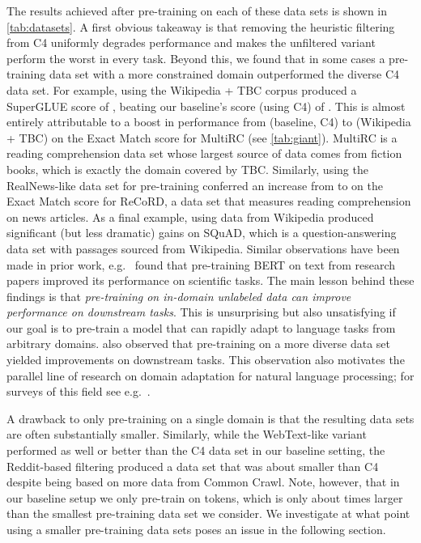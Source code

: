 \documentclass[twoside,11pt]{article}
\begin{document}
The results achieved after pre-training on each of these data sets is shown in \cref{tab:datasets}.
A first obvious takeaway is that removing the heuristic filtering from C4 uniformly degrades performance and makes the unfiltered variant perform the worst in every task.
Beyond this, we found that in some cases a pre-training data set with a more constrained domain outperformed the diverse C4 data set.
For example, using the Wikipedia + TBC corpus produced a SuperGLUE score of , beating our baseline's score (using C4) of .
This is almost entirely attributable to a boost in performance from  (baseline, C4) to  (Wikipedia + TBC) on the Exact Match score for MultiRC (see \cref{tab:giant}).
MultiRC is a reading comprehension data set whose largest source of data comes from fiction books, which is exactly the domain covered by TBC.
Similarly, using the RealNews-like data set for pre-training conferred an increase from  to  on the Exact Match score for ReCoRD, a data set that measures reading comprehension on news articles.
As a final example, using data from Wikipedia produced significant (but less dramatic) gains on SQuAD, which is a question-answering data set with passages sourced from Wikipedia.
Similar observations have been made in prior work, e.g.\ \citet{beltagy2019scibert} found that pre-training BERT on text from research papers improved its performance on scientific tasks.
The main lesson behind these findings is that \textit{pre-training on in-domain unlabeled data can improve performance on downstream tasks}.
This is unsurprising but also unsatisfying if our goal is to pre-train a model that can rapidly adapt to language tasks from arbitrary domains.
\citet{liu2019roberta} also observed that pre-training on a more diverse data set yielded improvements on downstream tasks.
This observation also motivates the parallel line of research on domain adaptation for natural language processing; for surveys of this field see e.g.\ \cite{ruder2019neural,li2012literature}.

A drawback to only pre-training on a single domain is that the resulting data sets are often substantially smaller.
Similarly, while the WebText-like variant performed as well or better than the C4 data set in our baseline setting, the Reddit-based filtering produced a data set that was about  smaller than C4 despite being based on  more data from Common Crawl.
Note, however, that in our baseline setup we only pre-train on  tokens, which is only about  times larger than the smallest pre-training data set we consider.
We investigate at what point using a smaller pre-training data sets poses an issue in the following section.
\end{document}
